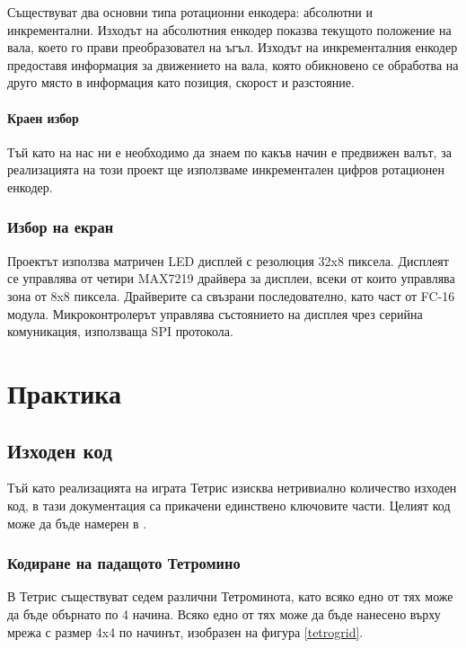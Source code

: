 \documentclass[titlepage, oneside, 12pt]{book}
\begin{document}
Съществуват два основни типа ротационни енкодера: абсолютни и инкрементални. Изходът на абсолютния енкодер показва текущото
положение на вала, което го прави преобразовател на ъгъл. Изходът на
инкременталния енкодер предоставя информация за движението на вала, която
обикновено се обработва на друго място в информация като позиция, скорост и
разстояние.

\subsubsection*{Краен избор}

Тъй като на нас ни е необходимо да знаем по какъв начин е предвижен валът, за
реализацията на този проект ще използваме инкрементален цифров ротационен
енкодер.

\subsection{Избор на екран}

Проектът използва матричен LED дисплей с резолюция 32x8 пиксела.
Дисплеят се управлява от четири MAX7219 \cite{displaytut} драйвера за дисплеи, всеки от които управлява зона
от 8x8 пиксела. Драйверите са свъзрани последователно, като част от FC-16
модула. Микроконтролерът управлява състоянието на дисплея чрез серийна комуникация,
използваща SPI протокола.

\chapter{Практика}

\section{Изходен код}

Тъй като реализацията на играта Тетрис изисква нетривиално количество изходен код,
в тази документация са прикачени единствено ключовите части. Целият код може да бъде намерен в \textcite{github}.

\subsection{Кодиране на падащото Тетромино}

В Тетрис съществуват седем различни Тетроминота, като всяко едно от тях може да бъде обърнато по 4 начина.
Всяко едно от тях може да бъде нанесено върху мрежа с размер 4x4 по начинът, изобразен на фигура \ref{tetrogrid}.
\end{document}
